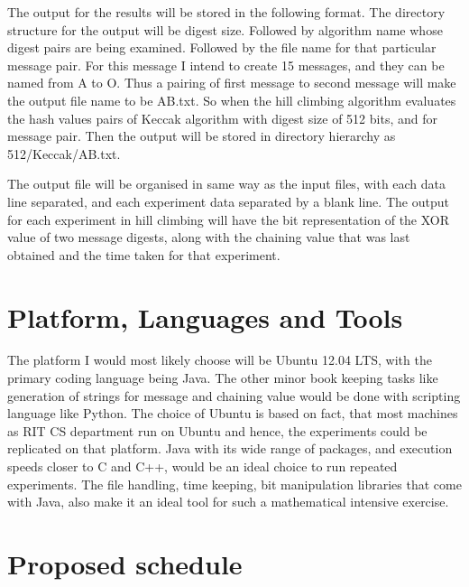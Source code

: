 The output for the results will be stored in the following format. The directory structure for the
output will be digest size. Followed by algorithm name whose digest pairs are being examined. Followed
by the file name for that particular message pair. For this message I intend to create 15 messages,
and they can be named from A to O. Thus a pairing of first message to second message will make the
output file name to be AB.txt. So when the hill climbing algorithm evaluates the hash values pairs
of Keccak algorithm with digest size of 512 bits, and for message pair. Then the output will be stored
in directory hierarchy as 512/Keccak/AB.txt.

The output file will be organised in same way as the input files, with each data line separated, and 
each experiment data separated by a blank line. The output for each experiment in hill climbing will
have the bit representation of the XOR value of two message digests, along with the chaining value
that was last obtained and the time taken for that experiment.

\section{Platform, Languages and Tools}

The platform I would most likely choose will be Ubuntu 12.04 LTS, with the primary coding language
being Java. The other minor book keeping tasks like generation of strings for message and chaining
value would be done with scripting language like Python. The choice of Ubuntu is based on fact, that
most machines as RIT CS department run on Ubuntu and hence, the experiments could be replicated
on that platform. Java with its wide range of packages, and execution speeds closer to C and C++,
would be an ideal choice to run repeated experiments. The file handling, time keeping, bit 
manipulation libraries that come with Java, also make it an ideal tool for such a mathematical 
intensive exercise.

\newpage

\section{Proposed schedule}

